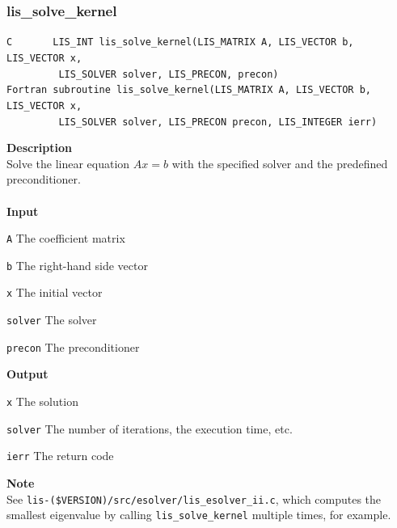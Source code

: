 \documentclass[a4paper]{article}
\newcommand{\namelistlabel}[1]{\mbox{#1}\hfill}
\newenvironment{namelist}[1]{%
\begin{list}{}
  {\let\makelabel\namelistlabel
  \settowidth{\labelwidth}{#1}
  \setlength{\leftmargin}{1.1\labelwidth}}
  }{%
\end{list}}
\begin{document}
\subsubsection{lis\_solve\_kernel}
\begin{screen}
\verb|C       LIS_INT lis_solve_kernel(LIS_MATRIX A, LIS_VECTOR b, LIS_VECTOR x,|\\
\verb|         LIS_SOLVER solver, LIS_PRECON, precon)|\\
\verb|Fortran subroutine lis_solve_kernel(LIS_MATRIX A, LIS_VECTOR b, LIS_VECTOR x,|\\
\verb|         LIS_SOLVER solver, LIS_PRECON precon, LIS_INTEGER ierr)|
\end{screen}
{\bf Description}\\
\indent
Solve the linear equation $Ax = b$ with the specified solver and the predefined preconditioner.
\\ \\
\noindent
{\bf Input}
\begin{namelist}{XXXXXXXXXXXXXXXXXXXX}
\item[\tt A] The coefficient matrix
\item[\tt b] The right-hand side vector
\item[\tt x] The initial vector
\item[\tt solver] The solver
\item[\tt precon] The preconditioner
\end{namelist}
{\bf Output}
\begin{namelist}{XXXXXXXXXXXXXXXXXXXX}
\item[\tt x] The solution
\item[\tt solver] The number of iterations, the execution time, etc.
\item[\tt ierr] The return code
\end{namelist}
{\bf Note}\\
\indent
See {\tt lis-(\$VERSION)/src/esolver/lis\_esolver\_ii.c}, 
which computes the smallest eigenvalue by calling 
\verb|lis_solve_kernel| multiple times, for example. 

\newpage
\end{document}
